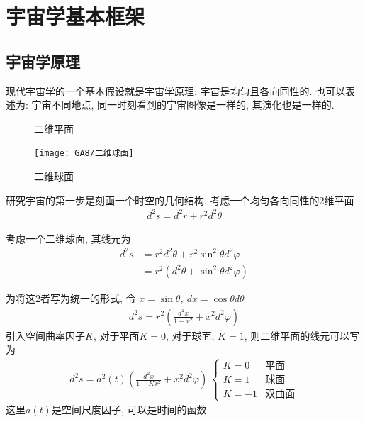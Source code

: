 \newpage

\section{宇宙学基本框架}
\subsection{宇宙学原理}
现代宇宙学的一个基本假设就是宇宙学原理: 宇宙是均匀且各向同性的. 也可以表述为: 宇宙不同地点, 同一时刻看到的宇宙图像是一样的, 其演化也是一样的. 
\begin{figure}[!htb]
    \centering
    \begin{minipage}{0.24\textwidth}
        \centering
        \caption{二维平面}
    \end{minipage}
    \begin{minipage}{0.24\textwidth}
        \centering
        \texttt{[image: GA8/二维球面]}
        \caption{二维球面}
    \end{minipage}
\end{figure}

研究宇宙的第一步是刻画一个时空的几何结构. 考虑一个均匀各向同性的2维平面
\begin{align*}
    d^2 s=d^2 r+r^2d^2\theta
\end{align*}

考虑一个二维球面, 其线元为
\begin{align*}
    d^2 s&=r^2d^2\theta+r^2\sin^2\theta d^2\varphi\\
    &=r^2 (d^2\theta+\sin^2\theta d^2 \varphi)
\end{align*}

为将这2者写为统一的形式, 令 $x=\sin\theta,\ dx=\cos\theta d\theta$
\begin{align*}
    d^2 s=r^2 \left( \frac{d^2 x}{1-x^2}+x^2d^2\varphi \right)
\end{align*}
引入空间曲率因子$K$, 对于平面$K=0$, 对于球面, $K=1$, 则二维平面的线元可以写为
\begin{align*}
    d^2 s=a^2(t) \left( \frac{d^2 x}{1-Kx^2}+x^2d^2\varphi \right)\ \left\{\begin{array}{ll}
        K=0 & \text{平面} \\
        K=1 & \text{球面} \\
        K=-1& \text{双曲面} 
    \end{array} \right.
\end{align*}
这里$a(t)$是空间尺度因子, 可以是时间的函数. 

